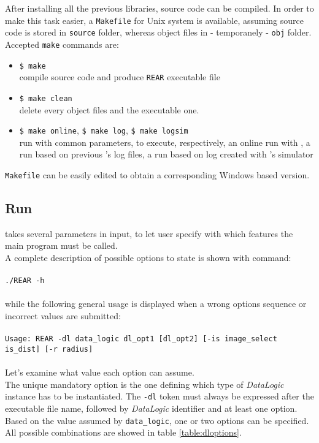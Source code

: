 After installing all the previous libraries, \framework{}
source code can be compiled. In order to make this
task easier, a \texttt{Makefile} for Unix system
is available, assuming source code is stored in
\texttt{source} folder, whereas object files in - 
temporanely - \texttt{obj} folder.
\\
Accepted \texttt{make} commands are: 

\begin{itemize}

  \item \texttt{\$ make} \\
    compile source code and produce \texttt{REAR} executable
    file

  \item \texttt{\$ make clean} \\
    delete every object files and the executable one.

  \item \texttt{\$ make online}, \texttt{\$ make log}, \texttt{\$ make logsim} \\
    run \framework{} with common parameters, to execute, respectively,
    an online run with \morduc{}, a run based on previous \morduc{}'s log files,
    a run based on log created with \morduc{}'s simulator

\end{itemize}

\texttt{Makefile} can be easily edited to obtain a corresponding
Windows based version.


\subsection{Run \framework{}}
\label{sourcecode:downloadrun:run}

\framework{} takes several parameters in input, to let
user specify with which features the main program must be called. 
\\
A complete description of possible options to state is
shown with command:
\\
\\
\texttt{./REAR -h}
\\
\\
while the following general usage is displayed when a wrong options sequence
or incorrect values are submitted:
\\
\\
\texttt{Usage: REAR -dl data\_logic dl\_opt1 [dl\_opt2]
  [-is image\_select is\_dist] [-r radius]}
\\
\\
Let's examine what value each option can assume.
\\
The unique mandatory option is the one defining which type
of \textit{DataLogic} instance has to be instantiated. The
\texttt{-dl} token must always be expressed after the
executable file name, followed by \textit{DataLogic} identifier
and at least one option.
\\
Based on the value assumed by \texttt{data\_logic}, one or
two options can be specified. All possible combinations
are showed in table \ref{table:dloptions}.

